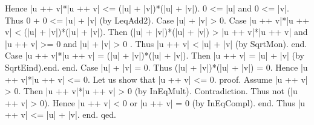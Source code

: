 \documentclass{article}
\newenvironment{forthel}{\begin{leftbar}}{\end{leftbar}}
\begin{document}
\begin{forthel}
Hence |u ++ v|*|u ++ v| <= (|u| + |v|)*(|u| + |v|).
0 <= |u| and 0 <= |v|. Thus 0 + 0 <= |u| + |v| (by LeqAdd2).
Case |u| + |v| > 0. 
Case |u ++ v|*|u ++ v| < (|u| + |v|)*(|u| + |v|). 
Then (|u| + |v|)*(|u| + |v|) > |u ++ v|*|u ++ v| and |u ++ v| >= 0 and |u| + |v| > 0 .
Thus |u ++ v| < |u| + |v| (by SqrtMon). end.
Case |u ++ v|*|u ++ v| = (|u| + |v|)*(|u| + |v|). Then |u ++ v| = |u| + |v| (by SqrtEind).end.
end.
Case |u| + |v| = 0. Thus (|u| + |v|)*(|u| + |v|) = 0. Hence |u ++ v|*|u ++ v| <= 0. 
Let us show that |u ++ v| <= 0. 
proof. 	Assume |u ++ v| > 0. Then |u ++ v|*|u ++ v| > 0 (by InEqMult). Contradiction.
Thus not (|u ++ v| > 0). Hence |u ++ v| < 0 or |u ++ v| = 0 (by InEqCompl).
end.
Thus |u ++ v| <= |u| + |v|.
end.
qed.
\end{forthel}
\end{document}
